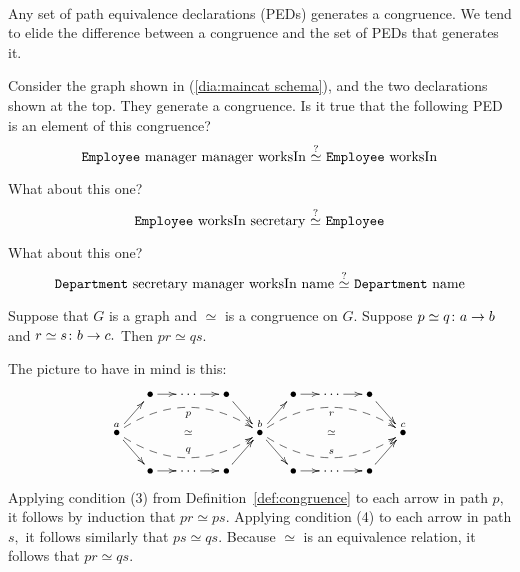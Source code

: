 \documentclass[../main/CT4S-EN-RU]{subfiles}
\begin{document}
\begin{definitionRUS}\label{def:congruence}\
\end{definitionRUS}

\begin{blockENG}
Any set of path equivalence declarations (PEDs) generates a congruence. We tend to elide the difference between a congruence and the set of PEDs that generates it.
\end{blockENG}

\begin{blockRUS}
\end{blockRUS}

\begin{exerciseENG}\label{exc:generating congruence}
Consider the graph shown in (\ref{dia:maincat schema}), and the two declarations shown at the top. They generate a congruence. 
\sexc Is it true that the following PED is an element of this congruence? $$\textnormal{{\tt Employee} manager manager worksIn $\stackrel{?}{\simeq}$ {\tt Employee} worksIn}$$ \item What about this one? $$\textnormal{{\tt Employee} worksIn secretary $\stackrel{?}{\simeq}$ {\tt Employee}}$$ 
\item What about this one? $$\textnormal{{\tt Department} secretary manager worksIn name $\stackrel{?}{\simeq}$ {\tt Department} name}$$
\endsexc
\end{exerciseENG}

\begin{exerciseRUS}\label{exc:generating congruence}
\end{exerciseRUS}

\begin{lemmaENG}\label{lemma:composing PEDs}
Suppose that $G$ is a graph and $\simeq$ is a congruence on $G.$ Suppose $p\simeq q\colon a\rightarrow b$ and $r\simeq s\colon b\rightarrow c.$ Then $pr\simeq qs.$
\end{lemmaENG}

\begin{lemmaRUS}\label{lemma:composing PEDs}
\end{lemmaRUS}

\begin{proofENG}
The picture to have in mind is this: $$\xymatrix@=13pt{&\bullet\ar[r]&\cdots\ar[r]&\bullet\ar[dr]&&\bullet\ar[r]&\cdots\ar[r]&\bullet\ar[dr]\\\LMO{a}\ar@{}[rrrr]|{\simeq}\ar[ur]\ar[dr]\ar@{-->}@/^1.5pc/[rrrr]_p\ar@{-->}@/_1.5pc/[rrrr]^q&&&&\LMO{b}\ar@{}[rrrr]|{\simeq}\ar[ur]\ar[dr]\ar@{-->}@/^1.5pc/[rrrr]_r\ar@{-->}@/_1.5pc/[rrrr]^s&&&&\LMO{c}\\&\bullet\ar[r]&\cdots\ar[r]&\bullet\ar[ur]&&\bullet\ar[r]&\cdots\ar[r]&\bullet\ar[ur]}$$ Applying condition (3) from Definition~\ref{def:congruence} to each arrow in path $p,$ it follows by induction that $pr\simeq ps.$ Applying condition (4) to each arrow in path $s,$ it follows similarly that $ps\simeq qs.$ Because $\simeq$ is an equivalence relation, it follows that $pr\simeq qs.$ 
\end{proofENG}
\end{document}
